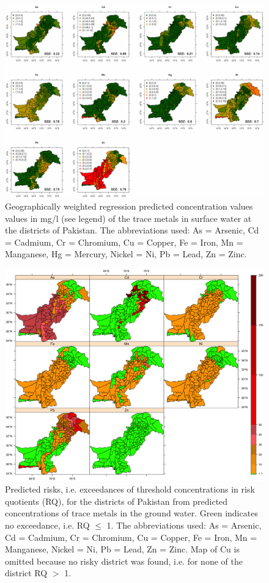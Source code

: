 \begin{landscape}
\begin{figure}[t]
  \centering
  \vspace*{-1.5cm}
  \includegraphics[width=0.9\linewidth]{Figures/Fig_5_3.png}
  \caption{Geographically weighted regression predicted concentration values values in mg/l (see legend) of the trace metals in surface water at the districts of Pakistan.  The abbreviations used: As = Arsenic, Cd = Cadmium, Cr = Chromium, Cu = Copper, Fe = Iron, Mn = Manganese, Hg = Mercury, Nickel = Ni, Pb = Lead, Zn = Zinc.}
  \label{Fig_5_3}
\end{figure}
\end{landscape}

\begin{figure}[t]
  \centering
  \includegraphics[width=\textwidth]{Figures/Fig_5_4.png}
  \caption{Predicted risks, i.e. exceedances of threshold concentrations in risk quotients (RQ), for the districts of Pakistan from predicted concentrations of trace metals in the ground water. Green indicates no exceedance, i.e. RQ $\leq$ 1. The abbreviations used: As = Arsenic, Cd = Cadmium, Cr = Chromium, Cu = Copper, Fe = Iron, Mn = Manganese, Nickel = Ni, Pb = Lead, Zn = Zinc. Map of Cu is omitted because no risky district was found, i.e. for none of the district RQ $>$ 1.}
  \label{Fig_5_4}
\end{figure}

